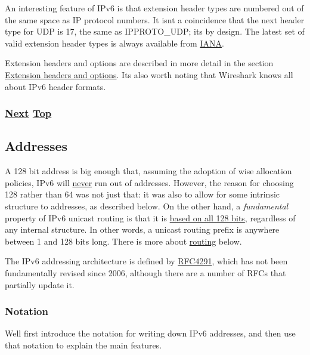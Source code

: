 \documentclass[
]{article}
\begin{document}
An interesting feature of IPv6 is that extension header types are
numbered out of the same space as IP protocol numbers. It
isn\textquotesingle t a coincidence that the next header type for UDP is
17, the same as IPPROTO\_UDP; it\textquotesingle s by design. The latest
set of valid extension header types is always available from
\href{https://www.iana.org/assignments/ipv6-parameters/ipv6-parameters.xhtml}{IANA}.

Extension headers and options are described in more detail in the
section \hyperref[extension-headers-and-options]{Extension headers and
options}. It\textquotesingle s also worth noting that Wireshark knows
all about IPv6 header formats.

\subsubsection{\texorpdfstring{\hyperref[addresses]{Next}
\hyperref[ipv6-basic-technology]{Top}}{Next Top}}\label{next-top-1}

\pagebreak

\subsection{Addresses}\label{addresses}

A 128 bit address is big enough that, assuming the adoption of wise
allocation policies, IPv6 will \href{https://m.xkcd.com/865/}{never} run
out of addresses. However, the reason for choosing 128 rather than 64
was not just that: it was also to allow for some intrinsic structure to
addresses, as described below. On the other hand, a \emph{fundamental}
property of IPv6 unicast routing is that it is
\href{http://www.rfc-editor.org/info/bcp198}{based on all 128 bits},
regardless of any internal structure. In other words, a unicast routing
prefix is anywhere between 1 and 128 bits long. There is more about
\hyperref[routing]{routing} below.

The IPv6 addressing architecture is defined by
\href{http://www.rfc-editor.org/info/rfc4291}{RFC4291}, which has not
been fundamentally revised since 2006, although there are a number of
RFCs that partially update it.

\subsubsection{Notation}\label{notation}

We\textquotesingle ll first introduce the notation for writing down IPv6
addresses, and then use that notation to explain the main features.
\end{document}
